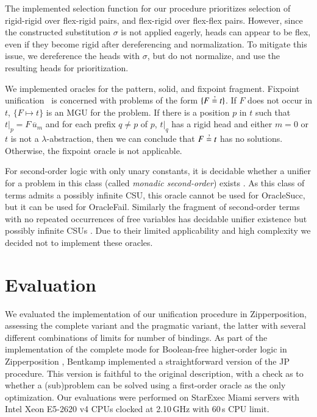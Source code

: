 The implemented selection function for our procedure prioritizes selection of
rigid-rigid over flex-rigid pairs, and flex-rigid over flex-flex pairs. However,
since the constructed substitution $\sigma$ is not applied eagerly, heads can
appear to be flex, even if they become rigid after dereferencing and
normalization. To mitigate this issue, we
dereference the heads with $\sigma$, but do not normalize, and use the resulting
heads for prioritization.

We implemented oracles for the pattern, solid, and fixpoint fragment. 
Fixpoint unification~\cite{gh-75-unification} is concerned with problems of the form
$\{F \unif t\}$. If $F$ does not occur in $t$, $\{ F \mapsto t \}$
is an MGU for the problem. If there is a position $p$ in $t$ such that 
$t|_p = F \, \overline{u}_m$
and for each prefix $q\neq p$ of $p$, $t|_q$ has a rigid head and either $m=0$ or $t$ is not a $\lambda$-abstraction,
then we can conclude that $F \unif t$ has no solutions. Otherwise,
the fixpoint oracle is not applicable.

For second-order logic with only unary constants, it is decidable whether
a unifier for a problem in this class (called
\emph{monadic second-order}) exists \cite{wf-88-monadicunif}. As this class of terms admits a
possibly infinite CSU, this oracle cannot be used for \textsf{OracleSucc},
but it can be used for \textsf{OracleFail}. Similarly the fragment of
second-order terms with no repeated occurrences of free variables has decidable
unifier existence but possibly infinite CSUs
\cite{gd-01-unif-chapter}. Due to their limited applicability and high complexity we
decided not to implement these oracles.



\section{Evaluation}
\label{sec:unif:evaluation}We evaluated the implementation of our unification procedure in Zipperposition,
assessing the complete variant and the pragmatic variant, the latter with several
different combinations of limits for number of bindings. As part of the
implementation of the complete mode for Boolean-free higher-order logic in
Zipperposition \cite{bbtvw-21-sup-lam}, Bentkamp implemented a straightforward
version of the JP procedure. This version is faithful to the original description,
with a check as to whether a (sub)problem can be solved using a first-order oracle
as the only optimization. Our evaluations were performed on StarExec Miami
\cite{sst-14-starexec} servers with Intel Xeon E5-{2620 v4} CPUs clocked at {2.10}\,GHz with 60\,s CPU limit.

